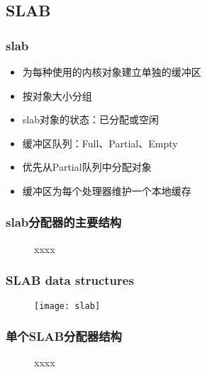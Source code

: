 \subsection{SLAB} %
\begin{frame}[plain,t]    
    \frametitle{slab}
    \begin{itemize}
        \item 为每种使用的内核对象建立单独的缓冲区
        \item 按对象大小分组
        \item slab对象的状态：已分配或空闲
        \item 缓冲区队列：Full、Partial、Empty
        \item 优先从Partial队列中分配对象
        \item 缓冲区为每个处理器维护一个本地缓存
    \end{itemize}
\end{frame}
\begin{frame}[plain,t]    
    \frametitle{slab分配器的主要结构}
    \begin{figure}
        \centering
        \caption{xxxx}
    \end{figure}
\end{frame}
\begin{frame}[plain,t]    
    \frametitle{SLAB data structures}
    \begin{figure}
        \centering
        \texttt{[image: slab]}
    \end{figure}
\end{frame}
\begin{frame}[plain,t]    
    \frametitle{单个SLAB分配器结构}
    \begin{figure}
        \centering
        \caption{xxxx}
    \end{figure}
\end{frame}
